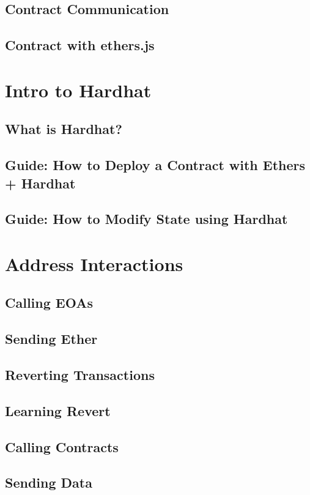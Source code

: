 \documentclass[a4paper, oneside]{book}
\begin{document}
\subsection{Contract Communication}
\subsection{Contract with ethers.js}

\section{Intro to Hardhat}
\subsection{What is Hardhat?}
\subsection{Guide: How to Deploy a Contract with Ethers + Hardhat}
\subsection{Guide: How to Modify State using Hardhat}

\section{Address Interactions}
\subsection{Calling EOAs}
\subsection{Sending Ether}
\subsection{Reverting Transactions}
\subsection{Learning Revert}
\subsection{Calling Contracts}
\subsection{Sending Data}
\end{document}
